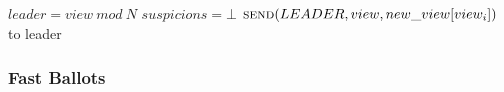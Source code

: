 \documentclass[algorithms,article,accept,moreauthors,pdftex,10pt,a4paper]{Definitions/mdpi}
\begin{document}
\begin{algorithm}[H]
\begin{algorithmic}[1]
\State\hspace{\algorithmicindent}\hspace{\algorithmicindent} $leader = view\ mod\ N$
\State\hspace{\algorithmicindent}\hspace{\algorithmicindent} $suspicions = \bot$
\State\hspace{\algorithmicindent}\hspace{\algorithmicindent} $\Call{send}{LEADER, view, new\_view[view_i]}$ to leader
\end{algorithmic}
\end{algorithm}

\subsubsection{Fast Ballots} 
\end{document}
